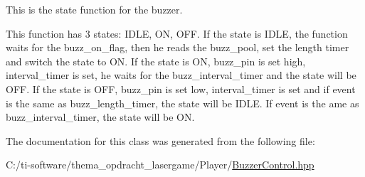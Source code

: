 This is the state function for the buzzer. 

This function has 3 states\+: I\+D\+LE, ON, O\+FF. If the state is I\+D\+LE, the function waits for the buzz\+\_\+on\+\_\+flag, then he reads the buzz\+\_\+pool, set the length timer and switch the state to ON. If the state is ON, buzz\+\_\+pin is set high, interval\+\_\+timer is set, he waits for the buzz\+\_\+interval\+\_\+timer and the state will be O\+FF. If the state is O\+FF, buzz\+\_\+pin is set low, interval\+\_\+timer is set and if event is the same as buzz\+\_\+length\+\_\+timer, the state will be I\+D\+LE. If event is the ame as buzz\+\_\+interval\+\_\+timer, the state will be ON. 

The documentation for this class was generated from the following file\+:\begin{DoxyCompactItemize}
\item 
C\+:/ti-\/software/thema\+\_\+opdracht\+\_\+lasergame/\+Player/\mbox{\hyperlink{_buzzer_control_8hpp}{Buzzer\+Control.\+hpp}}\end{DoxyCompactItemize}

